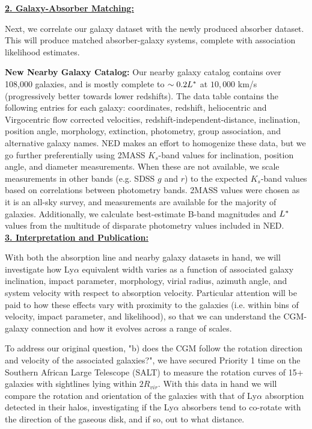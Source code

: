 \documentclass[12pt]{article}
\begin{document}
\noindent \textbf{\underline{2. Galaxy-Absorber Matching:}}

Next, we correlate our galaxy dataset with the newly produced absorber dataset. This will produce matched absorber-galaxy systems, complete with association likelihood estimates. 

\textbf{New Nearby Galaxy Catalog:} Our nearby galaxy catalog contains over 108,000 galaxies, and is mostly complete to $\sim0.2 L^{\**}$ at $10,000$ km/s (progressively better towards lower redshifts). The data table contains the following entries for each galaxy: coordinates, redshift, heliocentric and Virgocentric flow corrected velocities, redshift-independent-distance, inclination, position angle, morphology, extinction, photometry, group association, and alternative galaxy names. NED makes an effort to homogenize these data, but we go further preferentially using 2MASS $K_s$-band values for inclination, position angle, and diameter measurements. When these are not available, we scale measurements in other bands (e.g. SDSS $g$ and $r$) to the expected $K_s$-band values based on correlations between photometry bands. 2MASS values were chosen as it is an all-sky survey, and measurements are available for the majority of galaxies. Additionally, we calculate best-estimate B-band magnitudes and $L^{\**}$ values from the multitude of disparate photometry values included in NED. \\


\noindent \textbf{\underline{3. Interpretation and Publication:}}

With both the absorption line and nearby galaxy datasets in hand, we will investigate how Ly$\alpha$ equivalent width varies as a function of associated galaxy inclination, impact parameter, morphology, virial radius, azimuth angle, and system velocity with respect to absorption velocity. Particular attention will be paid to how these effects vary with proximity to the galaxies (i.e. within bins of velocity,  impact parameter, and likelihood), so that we can understand the CGM-galaxy connection and how it evolves across a range of scales. 

To address our original question, "b) does the CGM follow the rotation direction and velocity of the associated galaxies?", we have secured Priority 1 time on the Southern African Large Telescope (SALT) to measure the rotation curves of 15+ galaxies with sightlines lying within $2R_{vir}$. With this data in hand we will compare the rotation and orientation of the galaxies with that of Ly$\alpha$ absorption detected in their halos, investigating if the Ly$\alpha$ absorbers tend to co-rotate with the direction of the gaseous disk, and if so, out to what distance.
\end{document}

